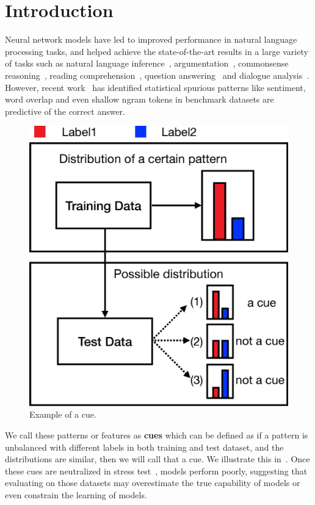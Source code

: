 \section{Introduction}
\label{sec:intro}
Neural network models have led to improved performance 
in natural language processing tasks, and helped achieve
the state-of-the-art results in a large variety of tasks
such as natural language inference~\cite{bowmanlarge,bowman2015large,wang2018glue}, 
argumentation~\cite{niven2019probing}, commonsense
reasoning~\cite{mostafazadeh2016corpus,roemmele2011choice,zellers2018swag}, 
reading comprehension~\cite{lai2017race}, question answering~\cite{talmor2019commonsenseqa} 
and dialogue analysis~\cite{lowe2015ubuntu}. 
However, recent work~\cite{gururangan2018annotation,sanchez2018behavior,poliak2018hypothesis}
 has identified statistical spurious patterns like sentiment, word overlap
and even shallow ngram tokens in benchmark datasets 
are predictive of the correct answer. 
\begin{figure}[th]
\centering
\includegraphics[width=0.6\columnwidth]{picture/cue_def.eps}
\caption{Example of a cue.}
\label{fig:cue_def}
\end{figure}
We call these patterns or features as \textbf{cues} which can be 
defined as if a pattern is unbalanced with different 
labels in both training and test dataset, 
and the distributions are similar, then we will call that a cue.
We illustrate this in~. 
Once these cues are neutralized in 
stress test~\cite{naik2018stress,mccoy2019right}, 
models perform poorly, suggesting 
that evaluating on those datasets may overestimate the true capability of 
models or even constrain the learning  of models. 



